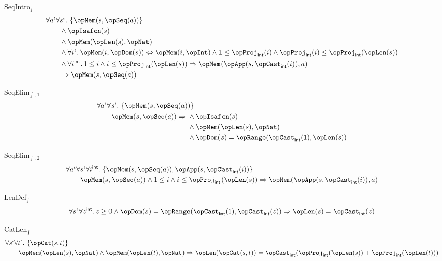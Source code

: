 \documentclass[11pt, a4paper, oneside]{article}
\begin{document}
\begin{axioms}
\item[SeqIntro$_\int$] \[
        \begin{aligned}
            &\forall a^\idv \forall s^\idv.\, \st{ \opMem(s, \opSeq(a)) } \\
            &\qquad \wedge \opIsafcn(s) \\
            &\qquad \wedge \opMem(\opLen(s), \opNat) \\
            &\qquad \wedge \forall i^\idv.\, \opMem(i, \opDom(s)) \eqv \opMem(i, \opInt) \wedge 1 \le \opProj_\int(i) \wedge \opProj_\int(i) \le \opProj_\int(\opLen(s)) \\
            &\qquad \wedge \forall i^\int.\, 1 \le i \wedge i \le \opProj_\int(\opLen(s)) \imp \opMem(\opApp(s, \opCast_\int(i)), a) \\
            &\qquad \imp \opMem(s, \opSeq(a))
        \end{aligned}
    \]

\item[SeqElim$_{\int,1}$] \[
        \begin{aligned}
            &\forall a^\idv \forall s^\idv.\, \st{ \opMem(s, \opSeq(a)) } \\
            &\qquad \opMem(s, \opSeq(a)) \imp \begin{aligned}[t]
                &\wedge \opIsafcn(s) \\
                &\wedge \opMem(\opLen(s), \opNat) \\
                &\wedge \opDom(s) = \opRange(\opCast_\int(1), \opLen(s))
            \end{aligned}
        \end{aligned}
    \]

\item[SeqElim$_{\int,2}$] \[
        \begin{aligned}
            &\forall a^\idv \forall s^\idv \forall i^\int.\, \st{ \opMem(s, \opSeq(a)), \opApp(s, \opCast_\int(i)) } \\
            &\qquad \opMem(s, \opSeq(a)) \wedge 1 \le i \wedge i \le \opProj_\int(\opLen(s)) \imp \opMem(\opApp(s, \opCast_\int(i)), a)
        \end{aligned}
    \]

\item[LenDef$_\int$] \[
        \forall s^\idv \forall z^\int.\, z \ge 0 \wedge \opDom(s) = \opRange(\opCast_\int(1), \opCast_\int(z)) \imp \opLen(s) = \opCast_\int(z)
    \]

\item[CatLen$_\int$] \[
        \begin{aligned}
            &\forall s^\idv \forall t^\idv.\, \st{ \opCat(s, t) } \\
            &\qquad \opMem(\opLen(s), \opNat) \wedge \opMem(\opLen(t), \opNat) \imp \opLen(\opCat(s, t)) = \opCast_\int(\opProj_\int(\opLen(s)) + \opProj_\int(\opLen(t)))
        \end{aligned}
    \]


\end{axioms}
\end{document}
